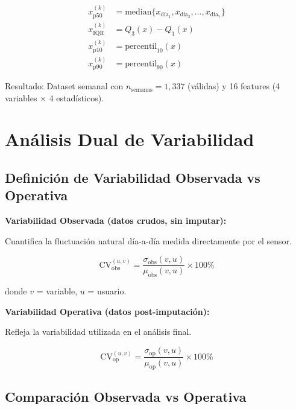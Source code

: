 \documentclass[12pt,letterpaper,twoside]{report}
\begin{document}
\begin{align}
x^{(k)}_{\text{p50}} &= \text{median}\{x_{\text{día}_1}, x_{\text{día}_2}, \ldots, x_{\text{día}_7}\} \\
x^{(k)}_{\text{IQR}} &= Q_3(x) - Q_1(x) \\
x^{(k)}_{\text{p10}} &= \text{percentil}_{10}(x) \\
x^{(k)}_{\text{p90}} &= \text{percentil}_{90}(x)
\end{align}

Resultado: Dataset semanal con $n_{\text{semanas}}=1,337$ (válidas) y 16 features (4 variables $\times$ 4 estadísticos).

\section{Análisis Dual de Variabilidad}

\subsection{Definición de Variabilidad Observada vs Operativa}

\begin{estadisticobox}
\textbf{Variabilidad Observada (datos crudos, sin imputar):}

Cuantifica la fluctuación natural día-a-día medida directamente por el sensor.

\begin{equation}
\text{CV}_{\text{obs}}^{(u,v)} = \frac{\sigma_{\text{obs}}(v, u)}{\mu_{\text{obs}}(v, u)} \times 100\%
\end{equation}

donde $v$ = variable, $u$ = usuario.

\textbf{Variabilidad Operativa (datos post-imputación):}

Refleja la variabilidad utilizada en el análisis final.

\begin{equation}
\text{CV}_{\text{op}}^{(u,v)} = \frac{\sigma_{\text{op}}(v, u)}{\mu_{\text{op}}(v, u)} \times 100\%
\end{equation}
\end{estadisticobox}

\subsection{Comparación Observada vs Operativa}
\end{document}
